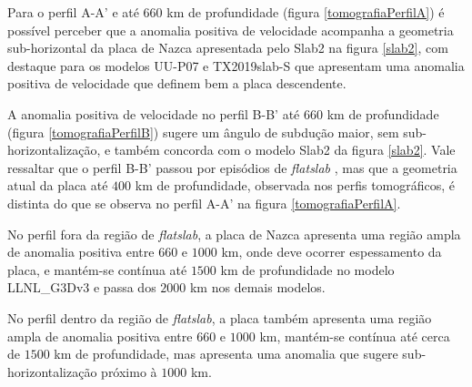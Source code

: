Para o perfil A-A' e até $660$ km de profundidade (figura \ref{tomografiaPerfilA}) é possível perceber que a anomalia positiva de velocidade acompanha a geometria sub-horizontal da placa de Nazca apresentada pelo Slab2 na figura \ref{slab2}, com destaque para os modelos UU-P07 e TX2019slab-S que apresentam uma anomalia positiva de velocidade que definem bem a placa descendente. 

A anomalia positiva de velocidade no perfil B-B' até $660$ km de profundidade (figura \ref{tomografiaPerfilB}) sugere um ângulo de subdução maior, sem sub-horizontalização, e também concorda com o modelo Slab2 da figura \ref{slab2}. Vale ressaltar que o perfil B-B' passou por episódios de \textit{flatslab} \citep{ramos2009andean}, mas que a geometria atual da placa até $400$ km de profundidade, observada nos perfis tomográficos, é distinta do que se observa no perfil A-A' na figura \ref{tomografiaPerfilA}.

No perfil fora da região de \textit{flatslab}, a placa de Nazca apresenta uma região ampla de anomalia positiva entre $660$ e $1000$ km, onde deve ocorrer espessamento da placa, e mantém-se contínua até $1500$ km de profundidade no modelo LLNL\_G3Dv3 e passa dos $2000$ km nos demais modelos.

No perfil dentro da região de \textit{flatslab}, a placa também apresenta uma região ampla de anomalia positiva entre $660$ e $1000$ km, mantém-se contínua até cerca de $1500$ km de profundidade, mas apresenta uma anomalia que sugere sub-horizontalização próximo à $1000$ km.




